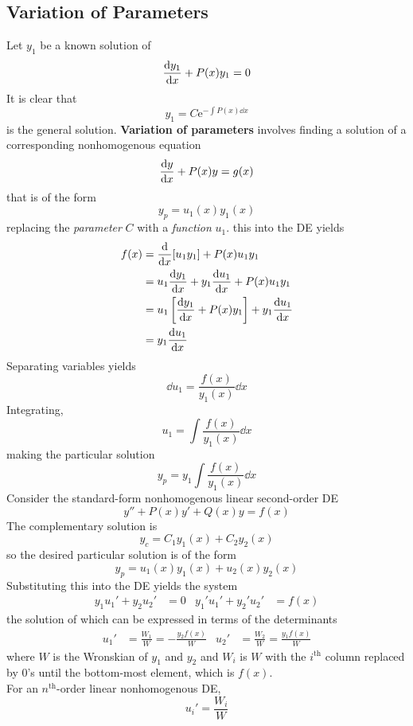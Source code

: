 \documentclass[12pt, A4]{article}
\newcommand{\en}{\text{e}}
\newcommand{\supt}[2]{#1^{\text{#2}}}
\begin{document}
		\subsection{Variation of Parameters}
			Let \(y_1\) be a known solution of
				\[\dv{y_1}{x} + P(x)y_1 = 0\]
				It is clear that
				\[y_1 = C\en^{-\int P(x)\dd{x}}\]
				is the general solution.
				\textbf{Variation of parameters} involves finding a solution of a corresponding nonhomogenous equation
				\[\dv{y}{x} + P(x)y = g(x)\]
				that is of the form
				\[y_p = u_1(x)y_1(x)\]
				replacing the \textit{parameter} \(C\) with a \textit{function} \(u_1\). this into the DE yields
				\begin{align*}
					f(x) &= \dv{x}[u_1y_1] + P(x)u_1y_1 \\
						&= u_1\dv{y_1}{x} + y_1\dv{u_1}{x} + P(x)u_1y_1 \\
						&= u_1\left[\dv{y_1}{x} + P(x)y_1\right] + y_1\dv{u_1}{x} \\
						&= y_1\dv{u_1}{x}
				\end{align*}
				Separating variables yields
				\[\dd{u_1} = \frac{f(x)}{y_1(x)}\dd{x}\]
				Integrating,
				\[u_1 = \int \frac{f(x)}{y_1(x)}\dd{x}\]
				making the particular solution
				\[y_p = y_1\int \frac{f(x)}{y_1(x)}\dd{x}\]
			Consider the standard-form nonhomogenous linear second-order DE
				\[y'' + P(x)y' + Q(x)y = f(x)\]
				The complementary solution is
				\[y_c = C_1y_1(x) + C_2y_2(x)\]
				so the desired particular solution is of the form
				\[y_p = u_1(x)y_1(x) + u_2(x)y_2(x)\]
				Substituting this into the DE yields the system
				\begin{align*}
					y_1u_1' + y_2u_2' &= 0 &
						y_1'u_1' + y_2'u_2' &= f(x)	
				\end{align*}
				the solution of which can be expressed in terms of the determinants
				\begin{align*}
					u_1' &= \frac{W_1}{W} = -\frac{y_2f(x)}{W} &
						u_2' &= \frac{W_2}{W} = \frac{y_1f(x)}{W}	
				\end{align*}
				where \(W\) is the Wronskian of \(y_1\) and \(y_2\) and \(W_i\) is \(W\) with the \(\supt{i}{th}\) column replaced by 0's until the bottom-most element, which is \(f(x)\). \\
				For an \(\supt{n}{th}\)-order linear nonhomogenous DE,
					\[u_i' = \frac{W_i}{W}\]
\end{document}
